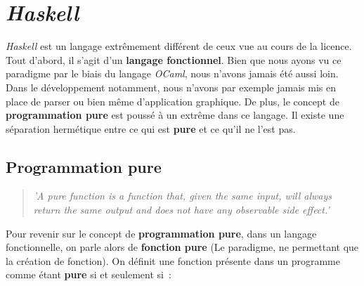 \section{\textit{Haskell}}

\textit{Haskell} est un langage extrêmement différent de ceux vue au cours de 
la licence. Tout d'abord, il s'agit d'un \textbf{langage fonctionnel}. Bien que 
nous ayons vu ce paradigme par le biais du langage \textit{OCaml}, 
nous n’avons jamais été aussi loin. Dans le développement notamment, nous 
n'avons par exemple jamais mis en place de parser ou bien même d'application 
graphique. De plus, le concept de \textbf{programmation pure} est poussé à un 
extrême dans ce langage. Il existe une séparation hermétique entre ce qui est 
\textbf{pure} et ce qu'il ne l'est pas.

\subsection{Programmation pure}

\begin{quotation}
    \textit{'A pure function is a function that, given the same input, will 
    always return the same output and does not have any observable side effect.'
    }\cite{citationPureProg}
\end{quotation}

Pour revenir sur le concept de \textbf{programmation pure}, dans un langage 
fonctionnelle, on parle alors de \textbf{fonction pure} (Le paradigme, ne 
permettant que la création de fonction). On définit une fonction présente dans 
un programme comme étant \textbf{pure} si et seulement si~:

